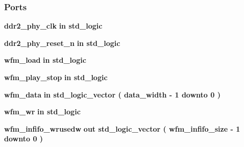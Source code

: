 \subsubsection*{Ports}
 \begin{DoxyCompactItemize}
\item 
{\bf ddr2\+\_\+phy\+\_\+clk}  {\bfseries {\bfseries \textcolor{keywordflow}{in}\textcolor{vhdlchar}{ }}} {\bfseries \textcolor{comment}{std\+\_\+logic}\textcolor{vhdlchar}{ }} 
\item 
{\bf ddr2\+\_\+phy\+\_\+reset\+\_\+n}  {\bfseries {\bfseries \textcolor{keywordflow}{in}\textcolor{vhdlchar}{ }}} {\bfseries \textcolor{comment}{std\+\_\+logic}\textcolor{vhdlchar}{ }} 
\item 
{\bf wfm\+\_\+load}  {\bfseries {\bfseries \textcolor{keywordflow}{in}\textcolor{vhdlchar}{ }}} {\bfseries \textcolor{comment}{std\+\_\+logic}\textcolor{vhdlchar}{ }} 
\item 
{\bf wfm\+\_\+play\+\_\+stop}  {\bfseries {\bfseries \textcolor{keywordflow}{in}\textcolor{vhdlchar}{ }}} {\bfseries \textcolor{comment}{std\+\_\+logic}\textcolor{vhdlchar}{ }} 
\item 
{\bf wfm\+\_\+data}  {\bfseries {\bfseries \textcolor{keywordflow}{in}\textcolor{vhdlchar}{ }}} {\bfseries \textcolor{comment}{std\+\_\+logic\+\_\+vector}\textcolor{vhdlchar}{ }\textcolor{vhdlchar}{(}\textcolor{vhdlchar}{ }\textcolor{vhdlchar}{ }\textcolor{vhdlchar}{ }\textcolor{vhdlchar}{ }{\bfseries {\bf data\+\_\+width}} \textcolor{vhdlchar}{-\/}\textcolor{vhdlchar}{ } \textcolor{vhdldigit}{1} \textcolor{vhdlchar}{ }\textcolor{keywordflow}{downto}\textcolor{vhdlchar}{ }\textcolor{vhdlchar}{ } \textcolor{vhdldigit}{0} \textcolor{vhdlchar}{ }\textcolor{vhdlchar}{)}\textcolor{vhdlchar}{ }} 
\item 
{\bf wfm\+\_\+wr}  {\bfseries {\bfseries \textcolor{keywordflow}{in}\textcolor{vhdlchar}{ }}} {\bfseries \textcolor{comment}{std\+\_\+logic}\textcolor{vhdlchar}{ }} 
\item 
{\bf wfm\+\_\+infifo\+\_\+wrusedw}  {\bfseries {\bfseries \textcolor{keywordflow}{out}\textcolor{vhdlchar}{ }}} {\bfseries \textcolor{comment}{std\+\_\+logic\+\_\+vector}\textcolor{vhdlchar}{ }\textcolor{vhdlchar}{(}\textcolor{vhdlchar}{ }\textcolor{vhdlchar}{ }\textcolor{vhdlchar}{ }\textcolor{vhdlchar}{ }{\bfseries {\bf wfm\+\_\+infifo\+\_\+size}} \textcolor{vhdlchar}{-\/}\textcolor{vhdlchar}{ } \textcolor{vhdldigit}{1} \textcolor{vhdlchar}{ }\textcolor{keywordflow}{downto}\textcolor{vhdlchar}{ }\textcolor{vhdlchar}{ } \textcolor{vhdldigit}{0} \textcolor{vhdlchar}{ }\textcolor{vhdlchar}{)}\textcolor{vhdlchar}{ }} 

\end{DoxyCompactItemize}
